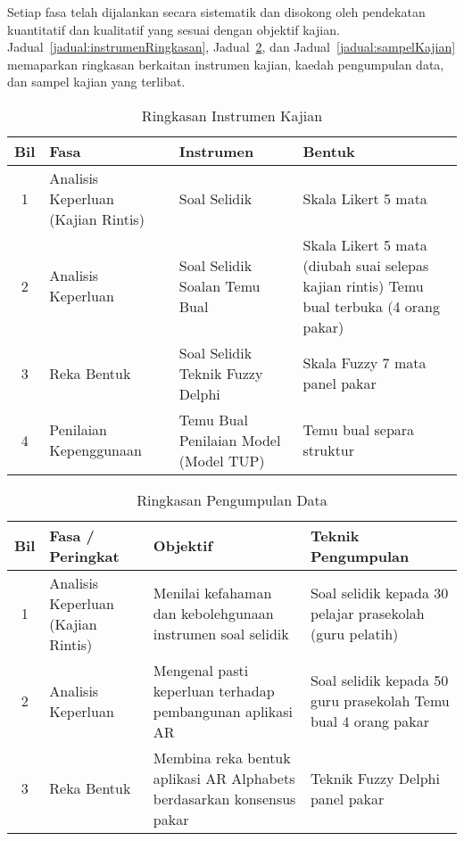 \begin{itemize}
Setiap fasa telah dijalankan secara sistematik dan disokong oleh pendekatan kuantitatif dan kualitatif yang sesuai dengan objektif kajian. Jadual~\ref{jadual:instrumenRingkasan}, Jadual~\ref{jadual:pengumpulanData}, dan Jadual~\ref{jadual:sampelKajian} memaparkan ringkasan berkaitan instrumen kajian, kaedah pengumpulan data, dan sampel kajian yang terlibat.
\begin{table}[H]
\centering
\caption{Ringkasan Instrumen Kajian}
\label{jadual:instrumenKajian}
\begin{tabular}{|c|p{4cm}|p{5cm}|p{4cm}|}
\hline
\textbf{Bil} & \textbf{Fasa} & \textbf{Instrumen} & \textbf{Bentuk} \\
\hline
1 & Analisis Keperluan (Kajian Rintis) & Soal Selidik & Skala Likert 5 mata \\
\hline
2 & Analisis Keperluan & Soal Selidik \newline Soalan Temu Bual & Skala Likert 5 mata (diubah suai selepas kajian rintis) \newline Temu bual terbuka (4 orang pakar) \\
\hline
3 & Reka Bentuk & Soal Selidik Teknik Fuzzy Delphi & Skala Fuzzy 7 mata \newline 20 panel pakar \\
\hline
4 & Penilaian Kepenggunaan & Temu Bual Penilaian Model (Model TUP) & Temu bual separa struktur \\
\hline
\end{tabular}
\end{table}
\begin{table}[H]
\centering
\caption{Ringkasan Pengumpulan Data}
\label{jadual:pengumpulanData}
\begin{tabular}{|c|p{4cm}|p{5cm}|p{5cm}|}
\hline
\textbf{Bil} & \textbf{Fasa / Peringkat} & \textbf{Objektif} & \textbf{Teknik Pengumpulan} \\
\hline
1 & Analisis Keperluan (Kajian Rintis) & Menilai kefahaman dan kebolehgunaan instrumen soal selidik & Soal selidik kepada 30 pelajar prasekolah (guru pelatih) \\
\hline
2 & Analisis Keperluan & Mengenal pasti keperluan terhadap pembangunan aplikasi AR & Soal selidik kepada 50 guru prasekolah \newline Temu bual 4 orang pakar \\
\hline
3 & Reka Bentuk & Membina reka bentuk aplikasi AR Alphabets berdasarkan konsensus pakar & Teknik Fuzzy Delphi \newline 20 panel pakar \\

\end{tabular}
\end{table}
\end{itemize}
